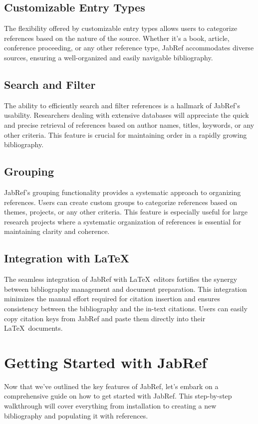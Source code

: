 		\subsection{Customizable Entry Types}
			The flexibility offered by customizable entry types allows users to categorize references based on the nature of the source. 
			Whether it's a book, article, conference proceeding, or any other reference type, JabRef accommodates diverse sources, ensuring a well-organized and easily navigable bibliography.

		\subsection{Search and Filter}
			The ability to efficiently search and filter references is a hallmark of JabRef's usability. 
			Researchers dealing with extensive databases will appreciate the quick and precise retrieval of references based on author names, titles, keywords, or any other criteria. 
			This feature is crucial for maintaining order in a rapidly growing bibliography.

		\subsection{Grouping}
			JabRef's grouping functionality provides a systematic approach to organizing references. 
			Users can create custom groups to categorize references based on themes, projects, or any other criteria. 
			This feature is especially useful for large research projects where a systematic organization of references is essential for maintaining clarity and coherence.

		\subsection{Integration with \LaTeX}
			The seamless integration of JabRef with \LaTeX\ editors fortifies the synergy between bibliography management and document preparation. 
			This integration minimizes the manual effort required for citation insertion and ensures consistency between the bibliography and the in-text citations. 
			Users can easily copy citation keys from JabRef and paste them directly into their \LaTeX\ documents.

	\section{Getting Started with JabRef}
		Now that we've outlined the key features of JabRef, let's embark on a comprehensive guide on how to get started with JabRef. 
		This step-by-step walkthrough will cover everything from installation to creating a new bibliography and populating it with references.

